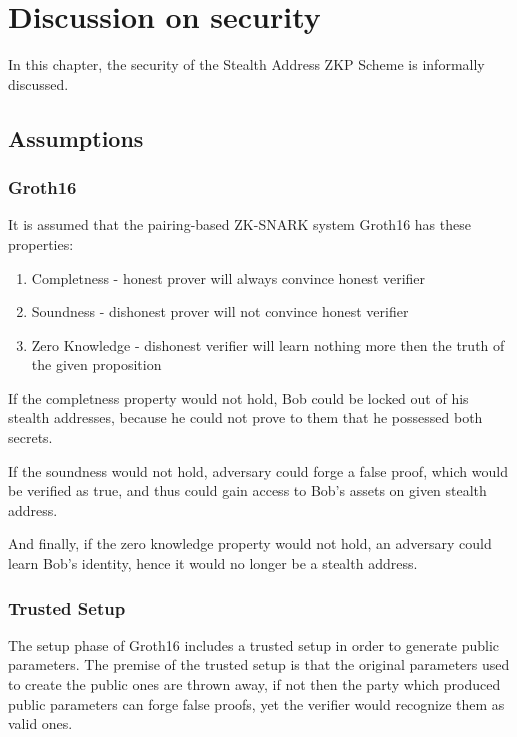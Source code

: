 \chapter{Discussion on security}

In this chapter, the security of the Stealth Address ZKP Scheme is informally discussed.

\section{Assumptions}

\subsection{Groth16}

It is assumed that the pairing-based ZK-SNARK system Groth16\cite{Groth16} has these properties:
\begin{enumerate}
    \item Completness - honest prover will always convince honest verifier
    \item Soundness - dishonest prover will not convince honest verifier
    \item Zero Knowledge - dishonest verifier will learn nothing more then the truth of the given proposition
\end{enumerate}

If the completness property would not hold, Bob could be locked out of his stealth
addresses, because he could not prove to them that he possessed both secrets.

If the soundness would not hold, adversary could forge a false proof, which
would be verified as true, and thus could gain access to Bob's assets on given
stealth address.

And finally, if the zero knowledge property would not hold, an adversary could
learn Bob's identity, hence it would no longer be a stealth address.

\subsection{Trusted Setup}

The setup phase of Groth16\cite{Groth16} includes a trusted setup in order to generate
public parameters. The premise of the trusted setup is that the original parameters
used to create the public ones are thrown away, if not then the party which
produced public parameters can forge false proofs, yet the verifier would
recognize them as valid ones.


